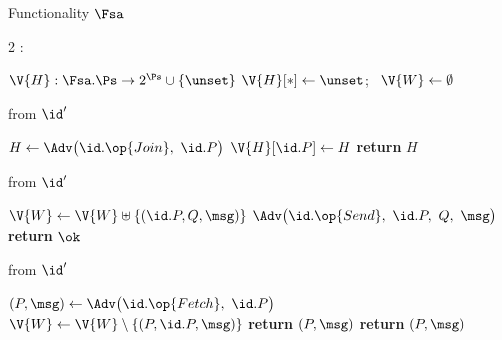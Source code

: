 \begin{interface}[nofloat]{Functionality $\Fsa$ \\
\params{$\PID$, \quad $\Ps$, \quad $\admits$, \quad
$\uses := \{(\Adv,\serves)\}$, \quad $\pars := \none$}}

{\scriptsize
\setlength{\columnsep}{1.4em}
\begin{multicols}{2}
:
\begin{algorithmic}[1]
\setcounter{contline}{0}\algcont
\State $\V{H} : \Fsa.\Ps \to 2^{\Ps} \cup \{\unset\}$
\State $\V{H}[*] \gets \unset$; \ $\V{W} \gets \emptyset$
\algsave
\end{algorithmic}
\vspace{1.4ex}

 \quad from $\id'$
\begin{algorithmic}[1]
\algcont
{}
\State $H \gets \Adv\bigl(\id.\op{Join},\ \id.P\bigr)$ \label{ln:sasetschosen}
 \label{ln:sadisjoint}
\State $\V{H}[\id.P] \gets H$
\State \textbf{return} $H$
\algsave
\end{algorithmic}
\vspace{1.4ex}

 \quad from $\id'$
\begin{algorithmic}[1]
\algcont
{}
\State $\V{W} \gets \V{W} \uplus \{(\id.P, Q, \msg)\}$ \label{ln:sawait}
\State $\Adv\bigl(\id.\op{Send},\ \id.P,\ Q,\ \msg\bigr)$ \label{ln:saleaksend}
\State \textbf{return} $\ok$
\algsave
\end{algorithmic}
\vspace{1.4ex}

\columnbreak

 \quad from $\id'$
\begin{algorithmic}[1]
\algcont
{} \label{ln:sajoinedfirst}
\State $(P, \msg) \gets \Adv\bigl(\id.\op{Fetch},\ \id.P\bigr)$ \label{ln:saadvnames}
 \label{ln:sainside}
   \label{ln:saauthentic}
  \State $\V{W} \gets \V{W} \setminus \{(P, \id.P, \msg)\}$
  \State \textbf{return} $(P, \msg)$
\EndIf
\State \textbf{return} $(P, \msg)$ \label{ln:saforge}
\algsave
\end{algorithmic}
\vspace{1.4ex}


\end{multicols}}
\end{interface}
